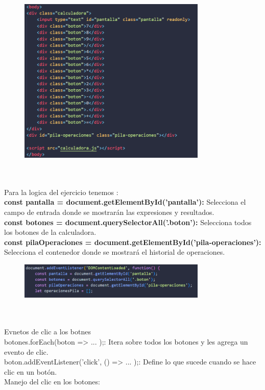 \documentclass{article}
\begin{document}
     \begin{figure}[H]
		          \centering
		          \includegraphics[width=0.8\textwidth,keepaspectratio]                       {img/bodyCal.png}
    \end{figure}  
\\
\\Para la logica del ejercicio tenemos :
\\\textbf{const pantalla = document.getElementById('pantalla'):} Selecciona el campo de entrada donde se mostrarán las expresiones y resultados.
\\\textbf{const botones = document.querySelectorAll('.boton'):} Selecciona todos los botones de la calculadora.
\\\textbf{const pilaOperaciones = document.getElementById('pila-operaciones'):} Selecciona el contenedor donde se mostrará el historial de operaciones.

 \begin{figure}[H]
		          \centering
		          \includegraphics[width=0.8\textwidth,keepaspectratio]                       {img/DOMCal.png}
    \end{figure}  
\\
\\Evnetos de clic a los botnes
\\botones.forEach(boton => { ... });: Itera sobre todos los botones y les agrega un evento de clic.
\\boton.addEventListener('click', () => { ... });: Define lo que sucede cuando se hace clic en un botón.
\\Manejo del clic en los botones:
\end{document}
